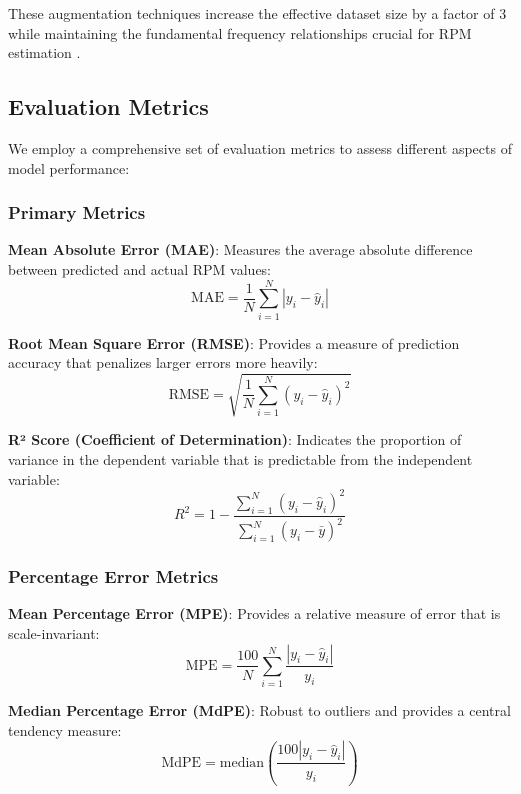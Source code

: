 \documentclass[journal,10pt]{IEEEtran}
\begin{document}
These augmentation techniques increase the effective dataset size by a factor of 3 while maintaining the fundamental frequency relationships crucial for RPM estimation \cite{IMAGECHEN}.

\subsection{Evaluation Metrics}

We employ a comprehensive set of evaluation metrics to assess different aspects of model performance:

\subsubsection{Primary Metrics}

\textbf{Mean Absolute Error (MAE)}: Measures the average absolute difference between predicted and actual RPM values:
\begin{equation}
\text{MAE} = \frac{1}{N} \sum_{i=1}^{N} |y_i - \hat{y}_i|
\end{equation}

\textbf{Root Mean Square Error (RMSE)}: Provides a measure of prediction accuracy that penalizes larger errors more heavily:
\begin{equation}
\text{RMSE} = \sqrt{\frac{1}{N} \sum_{i=1}^{N} (y_i - \hat{y}_i)^2}
\end{equation}

\textbf{R² Score (Coefficient of Determination)}: Indicates the proportion of variance in the dependent variable that is predictable from the independent variable:
\begin{equation}
R^2 = 1 - \frac{\sum_{i=1}^{N} (y_i - \hat{y}_i)^2}{\sum_{i=1}^{N} (y_i - \bar{y})^2}
\end{equation}

\subsubsection{Percentage Error Metrics}

\textbf{Mean Percentage Error (MPE)}: Provides a relative measure of error that is scale-invariant:
\begin{equation}
\text{MPE} = \frac{100}{N} \sum_{i=1}^{N} \frac{|y_i - \hat{y}_i|}{y_i}
\end{equation}

\textbf{Median Percentage Error (MdPE)}: Robust to outliers and provides a central tendency measure:
\begin{equation}
\text{MdPE} = \text{median}\left(\frac{100|y_i - \hat{y}_i|}{y_i}\right)
\end{equation}
\end{document}
